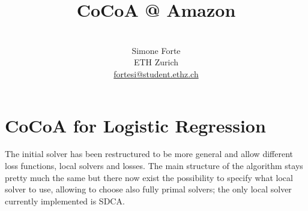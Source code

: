 \documentclass[11pt, a4paper, reqno, twoside]{scrartcl}
\theoremstyle{style}
\newcommand{\0}{\mathbf{0}} %
\begin{document}
\pagestyle{fancy}



\title{CoCoA @ Amazon}

\author{\\ Simone Forte\\
{\small ETH Zurich}\\
{\small \href{mailto:fortesi@student.ethz.ch}{fortesi@student.ethz.ch}}}
\date{}


\maketitle

\section{CoCoA for Logistic Regression}
The initial solver has been restructured to be more general and allow different loss functions, local solvers and losses. The main structure of the algorithm stays pretty much the same but there now exist the possibility to specify what local solver to use, allowing to choose also fully primal solvers; the only local solver currently implemented is SDCA.
\end{document}
